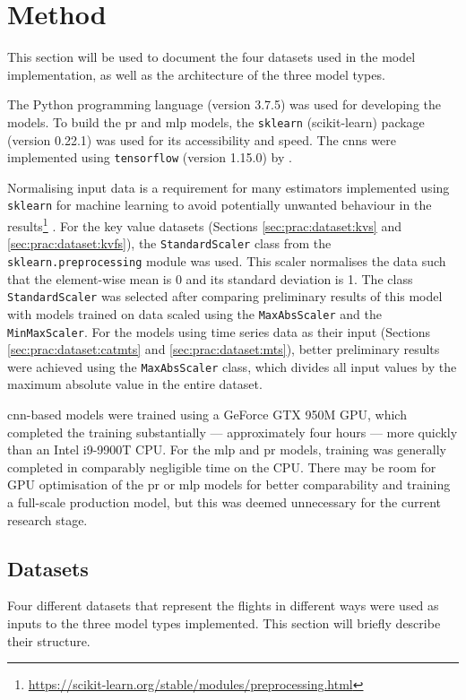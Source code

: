 \chapter{Method} \label{sec:prac}
This section will be used to document the four datasets used in the model implementation, as well as the architecture of the three model types.

The Python programming language (version 3.7.5) was used for developing the models. To build the \ac{pr} and \ac{mlp} models, the \texttt{sklearn} (scikit-learn) package (version 0.22.1) was used for its accessibility and speed. The \ac{cnn}s were implemented using \texttt{tensorflow} (version 1.15.0) by \citet[]{fawaz_inceptiontime_2019}.

Normalising input data is a requirement for many estimators implemented using \texttt{sklearn} for machine learning to avoid potentially unwanted behaviour in the results\footnote{\url{https://scikit-learn.org/stable/modules/preprocessing.html}} \cite[]{scikit-learn}. For the key value datasets (Sections \ref{sec:prac:dataset:kvs} and \ref{sec:prac:dataset:kvfs}), the \texttt{StandardScaler} class from the \texttt{sklearn.preprocessing} module was used. This scaler normalises the data such that the element-wise mean is 0 and its standard deviation is 1. The class \texttt{StandardScaler} was selected after comparing preliminary results of this model with models trained on data scaled using the \texttt{MaxAbsScaler} and the \texttt{MinMaxScaler}. For the models using time series data as their input (Sections \ref{sec:prac:dataset:catmts} and \ref{sec:prac:dataset:mts}), better preliminary results were achieved using the \texttt{MaxAbsScaler} class, which divides all input values by the maximum absolute value in the entire dataset.

\ac{cnn}-based models were trained using a GeForce GTX 950M GPU, which completed the training substantially --- approximately four hours --- more quickly than an Intel i9-9900T CPU. For the \ac{mlp} and \ac{pr} models, training was generally completed in comparably negligible time on the CPU. There may be room for GPU optimisation of the \ac{pr} or \ac{mlp} models for better comparability and training a full-scale production model, but this was deemed unnecessary for the current research stage.

\section{Datasets}
Four different datasets that represent the flights in different ways were used as inputs to the three model types implemented. This section will briefly describe their structure.

